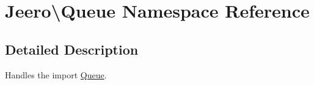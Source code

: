 \hypertarget{namespaceJeero_1_1Queue}{}\section{Jeero\textbackslash{}Queue Namespace Reference}
\label{namespaceJeero_1_1Queue}


\subsection{Detailed Description}
Handles the import \hyperlink{namespaceJeero_1_1Queue}{Queue}. 